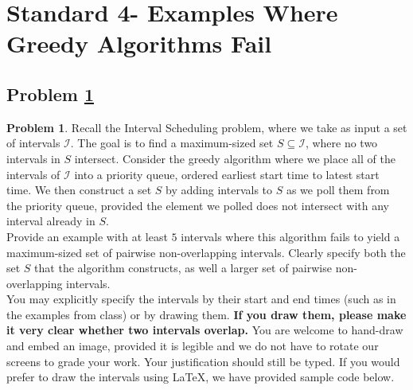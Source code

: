 \documentclass[11pt]{article}
\theoremstyle{definition}
\theoremstyle{definition}
\newtheorem{required}{Problem}
\theoremstyle{definition}
\newcommand{\interval}[4]{\draw (#2, #1) -- (#3, #1); %
\draw (#2, #1-0.11) -- (#2, #1+0.11); %
\draw (#3, #1-0.11) -- (#3, #1+0.11); %
\node[] at (#2-0.25, #1) {#4};
}
\begin{document}
\newpage
\section{Standard 4- Examples Where Greedy Algorithms Fail}

\subsection{Problem \ref{GreedyFail1}}
\begin{required} \label{GreedyFail1}
Recall the \textsf{Interval Scheduling} problem, where we take as input a set of intervals $\mathcal{I}$. The goal is to find a maximum-sized set $S \subseteq \mathcal{I}$, where no two intervals in $S$ intersect. Consider the greedy algorithm where we place all of the intervals of $\mathcal{I}$ into a priority queue, ordered earliest start time to latest start time. We then construct a set $S$ by adding intervals to $S$ as we poll them from the priority queue, provided the element we polled does not intersect with any interval already in $S$. \\

\noindent Provide an example with at least $5$ intervals where this algorithm fails to yield a maximum-sized set of pairwise non-overlapping intervals. Clearly specify both the set $S$ that the algorithm constructs, as well a larger set of pairwise non-overlapping intervals. \\

\noindent You may explicitly specify the intervals by their start and end times (such as in the examples from class) or by drawing them. \textbf{If you draw them, please make it very clear whether two intervals overlap.} You are welcome to hand-draw and embed an image, provided it is legible and we do not have to rotate our screens to grade your work. Your justification should still be typed. If you would prefer to draw the intervals using \LaTeX, we have provided sample code below.
\end{required}


\end{document}
